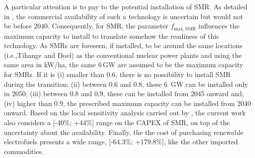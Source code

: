 \documentclass[11pt,twoside,a4paper,english]{article}
\def\ie{i.e.,}
\begin{document}
\begin{appendices}
A particular attention is to pay to the potential installation of \gls{SMR}. As detailed in , the commercial availability of such a technology is uncertain but would not be before 2040. Consequently, for \gls{SMR}, the parameter $f_{\mathrm{max,SMR}}$ influences the maximum capacity to install to translate somehow the readiness of this technology. As SMRs are foreseen, if installed, to be around the same locations (\ie Tihange and Doel) as the conventional nuclear power plants and using the same area in kW/ha, the same 6\,GW are assumed to be the maximum capacity for SMRs. If it is (i) smaller than 0.6, there is no possibility to install \gls{SMR} during the transition; (ii) between 0.6 and 0.8, these 6~GW can be installed only in 2050; (iii) between 0.8 and 0.9, these can be installed from 2045 onward and; (iv) higher than 0.9, the prescribed maximum capacity can be installed from 2040 onward. Based on the local sensitivity analysis carried out by \citet{PATHS2050}, the current work also considers a [-40\%; +44\%] range on the CAPEX of SMR, on top of the uncertainty about the availability. Finally, the the cost of purchasing renewable electrofuels presents a wide range, [-64.3\%; +179.8\%], like the other imported commodities.


\end{appendices}
\end{document}
